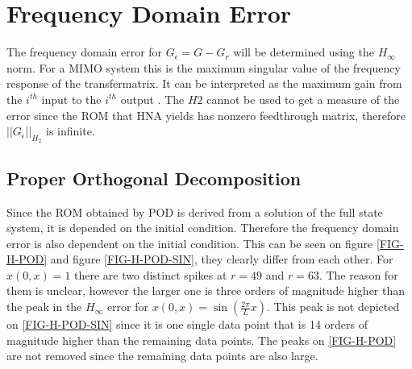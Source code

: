 \section{Frequency Domain Error}
The frequency domain error for \(G_{\epsilon }= G - G_r\) will be determined using the \(H_{\infty}\) norm.
For a MIMO system this is the maximum singular value of the frequency response of the transfermatrix.
It can be interpreted as the maximum gain from the \(i^{th}\) input to the \(i^{th}\) output \cite{eugenio}.
The \(H2\) cannot be used to get a measure of the error since the ROM that HNA yields has nonzero feedthrough matrix, therefore \(||G_{\epsilon}||_{H_{2}}\) is infinite. 

\subsection{Proper Orthogonal Decomposition}
Since the ROM obtained by POD is derived from a solution of the full state system, it is depended on the initial condition.
Therefore the frequency domain error is also dependent on the initial condition.
This can be seen on figure \ref{FIG-H-POD} and figure \ref{FIG-H-POD-SIN}, they clearly differ from each other.
For \(x(0, x) = 1\) there are two distinct spikes at \(r=49\) and \(r=63\).
The reason for them is unclear, however the larger one is three orders of magnitude higher than the peak in the \(H_{\infty}\) error for $x(0, x) =  \sin(\frac{2\pi}{L}x)$.
This peak is not depicted on \ref{FIG-H-POD-SIN} since it is one single data point that is 14 orders of magnitude higher than the remaining data points.
The peaks on \ref{FIG-H-POD} are not removed since the remaining data points are also large.
